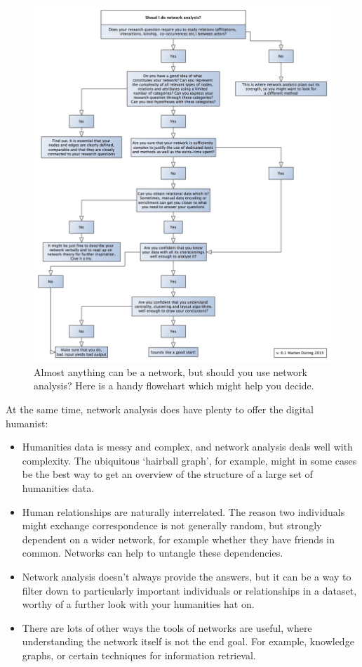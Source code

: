 \documentclass[
]{book}
\begin{document}
\begin{figure}
\centering
\includegraphics[width=5.20833in,height=\textheight]{images/shouldyoudonetworkanalysis_xxl.jpg}
\caption{Almost anything can be a network, but should you use network analysis? Here is a handy flowchart which might help you decide.}
\end{figure}

At the same time, network analysis does have plenty to offer the digital humanist:

\begin{itemize}
\item
  Humanities data is messy and complex, and network analysis deals well with complexity. The ubiquitous `hairball graph', for example, might in some cases be the best way to get an overview of the structure of a large set of humanities data.
\item
  Human relationships are naturally interrelated. The reason two individuals might exchange correspondence is not generally random, but strongly dependent on a wider network, for example whether they have friends in common. Networks can help to untangle these dependencies.
\item
  Network analysis doesn't always provide the answers, but it can be a way to filter down to particularly important individuals or relationships in a dataset, worthy of a further look with your humanities hat on.
\item
  There are lots of other ways the tools of networks are useful, where understanding the network itself is not the end goal. For example, knowledge graphs, or certain techniques for information retrieval.
\end{itemize}
\end{document}
